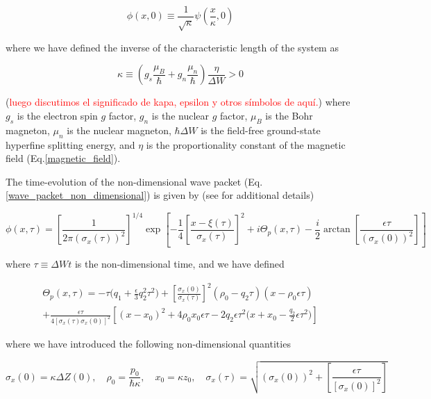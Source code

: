 \documentclass{article}
\begin{document}
\begin{equation}\label{wave_packet_non_dimensional}
\phi(x,0) \equiv \frac{1}{\sqrt{\kappa}} \psi(\frac{x}{\kappa}, 0)
\end{equation}

where we have defined the inverse of the characteristic length of the system as

\begin{equation}\label{kappa}
\kappa \equiv (g_{s}\frac{\mu_{B}}{\hbar} + g_{n}\frac{\mu_{n}}{\hbar}) \frac{\eta}{\Delta W} > 0
\end{equation}

(\textcolor{red}{luego discutimos el significado de kapa, epsilon y otros símbolos de aquí.}) where $g_{s}$ is the electron spin $g$ factor, $g_{n}$ is the nuclear $g$ factor, $\mu_{B}$ is the Bohr magneton, $\mu_{n}$ is the nuclear magneton, $\hbar \Delta W$ is the field-free ground-state hyperfine splitting energy, and $\eta$ is the proportionality constant of the magnetic field (Eq.\ref{magnetic_field}).

The time-evolution of the non-dimensional wave packet (Eq.\ref{wave_packet_non_dimensional}) is given by (see \cite{Castanos2014} for additional details)

\begin{equation}\label{wave_packet_non_dimensional_evolution}
\phi(x,\tau) = 
\left[\frac{1}{2 \pi (\sigma_{x}(\tau))^2} \right]^{1/4} \exp \left[-\frac{1}{4} \left[\frac{x-\xi(\tau)}{\sigma_{x}(\tau)}\right]^{2}  + i\Theta_{p}(x, \tau) - \frac{i}{2}\arctan\left[\frac{\epsilon \tau}{(\sigma_{x}(0))^{2}}\right] \right]
\end{equation}

where $\tau\equiv \Delta W t$ is the non-dimensional time, and we have defined 

\begin{multline}\label{theta_p}
\Theta_{p}(x,\tau) = -\tau \bigg(q_{1} + \frac{\epsilon}{3} q_{2}^{2} \tau^{2}\bigg) + \left[\frac{\sigma_{x}(0)}{\sigma_{x}(\tau)} \right]^{2} (\rho_{0} - q_{2} \tau)(x-\rho_{0} \epsilon \tau) \\
+ \frac{\epsilon \tau}{4 [\sigma_{x}(\tau)\sigma_{x}(0)]^{2}} \left[(x-x_{0})^{2} + 4\rho_{0} x_{0} \epsilon \tau -2q_{2} \epsilon \tau^{2} \bigg(x+x_{0}- \frac{q_{2}}{2} \epsilon \tau^{2} \bigg)\right]
\end{multline}

where we have introduced the following non-dimensional quantities

\begin{equation}\label{non_dimensional_definitions}
\sigma_{x}(0) = \kappa \Delta Z(0)\mathrm{,}\quad \rho_{0}=\frac{p_{0}}{\hbar \kappa} \mathrm{,}\quad 
x_{0}=\kappa z_{0} \mathrm{,}\quad 
\sigma_{x}(\tau) = \sqrt{(\sigma_{x}(0))^{2} + \left[\frac{\epsilon \tau}{[\sigma_{x}(0)]^{2}} \right]}
\end{equation}
\end{document}
